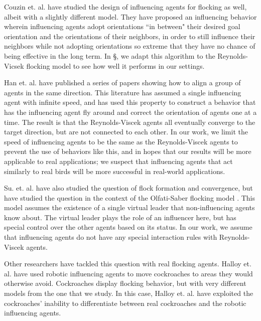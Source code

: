 Couzin et. al. \cite{couzin2005} have studied the design of influencing agents
for flocking as well, albeit with a slightly different model.
They have proposed an influencing behavior wherein influencing agents adopt
orientations ``in between" their desired goal orientation and the orientations
of their neighbors, in order to still influence their neighbors while not
adopting orientations so extreme that they have no chance of being effective in
the long term.
In \S\label{ch:influencing}, we adapt this algorithm to the Reynolds-Vicsek
flocking model to see how well it performs in our settings.

Han et. al. have \cite{han2010teleporting} published a series of papers showing
how to align a group of agents in the same direction.
This literature has assumed a single influencing agent with infinite speed, and
has used this property to construct a behavior that has the influencing agent
fly around and correct the orientation of agents one at a time.
The result is that the Reynolds-Viscek agents all eventually converge to the
target direction, but are not connected to each other.
In our work, we limit the speed of influencing agents to be the same as the
Reynolds-Viscek agents to prevent the use of behaviors like this, and in hopes
that our results will be more applicable to real applications; we suspect that
influencing agents that act similarly to real birds will be more successful in
real-world applications.

Su. et. al. \cite{su2009virtualleaderinformed} have also studied the question
of flock formation and convergence, but have studied the question in the
context of the Olfati-Saber flocking model
\cite{olfati2006virtualleaderinformed}.
This model assumes the existence of a single virtual leader that
non-influencing agents know about.
The virtual leader plays the role of an influencer here, but has special
control over the other agents based on its status.
In our work, we assume that influencing agents do not have any special
interaction rules with Reynolds-Viscek agents.

Other researchers have tackled this question with real flocking agents.
Halloy et. al. \cite{Halloy2007} have used robotic influencing agents to move
cockroaches to areas they would otherwise avoid.
Cockroaches display flocking behavior, but with very different models from the
one that we study.
In this case, Halloy et. al. have exploited the cockroaches' inability to
differentiate between real cockroaches and the robotic influencing agents.

